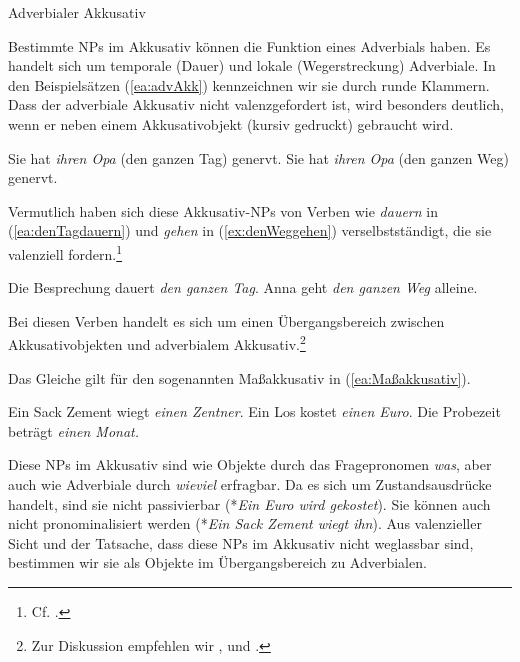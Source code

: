 \newpage
\begin{Exkurs}{Adverbialer Akkusativ}\label{Exkurs:adverbialerAkkusativ}

Bestimmte NPs im Akkusativ können die Funktion eines Adverbials haben. Es handelt sich um temporale (Dauer) und lokale (Wegerstreckung) Adverbiale. In den Beispielsätzen (\ref{ea:advAkk}) kennzeichnen wir sie durch runde Klammern. Dass der adverbiale Akkusativ nicht valenzgefordert ist, wird besonders deutlich, wenn er neben einem Akkusativobjekt (kursiv gedruckt) gebraucht wird. 

\ea \label{ea:advAkk}
\ea \label{ea:tempAkk} Sie hat \textit{ihren Opa} (den ganzen Tag) genervt.
\ex \label{ex:lokAkk} Sie hat \textit{ihren Opa} (den ganzen Weg) genervt.
\z
\z 

Vermutlich haben sich diese Akkusativ-NPs von Verben wie \textit{dauern} in (\ref{ea:denTagdauern}) und \textit{gehen} in (\ref{ex:denWeggehen}) verselbstständigt, die sie valenziell fordern.\footnote{Cf. \citet[350]{Rostila2007}.} 

\ea \label{ea:AkkobjwirdadvAkk}
\ea \label{ea:denTagdauern} Die Besprechung dauert \textit{den ganzen Tag}. 
\ex \label{ex:denWeggehen} Anna geht \textit{den ganzen Weg} alleine.
\z 
\z 

Bei diesen Verben handelt es sich um einen Übergangsbereich zwischen Akkusativobjekten und adverbialem Akkusativ.\footnote{Zur Diskussion empfehlen wir \citet[58--61]{Bausewein1990}, \citet[31--33]{Duerscheid1999} und \citet[147--149]{Welke2019}.} 

Das Gleiche gilt für den sogenannten Maßakkusativ in (\ref{ea:Maßakkusativ}).

\ea \label{ea:Maßakkusativ}
\ea \label{ea:wiegen} Ein Sack Zement wiegt \textit{einen Zentner}.
\ex \label{ex:kosten} Ein Los kostet \textit{einen Euro}.
\ex \label{ex:betragen} Die Probezeit beträgt \textit{einen Monat.}
\z 
\z 

Diese NPs im Akkusativ sind wie Objekte durch das Fragepronomen \textit{was}, aber auch wie Adverbiale durch \textit{wieviel} erfragbar. Da es sich um Zustandsausdrücke handelt, sind sie nicht passivierbar (*\textit{Ein Euro wird gekostet}). Sie können auch nicht pronominalisiert werden (*\textit{Ein Sack Zement wiegt ihn}). Aus valenzieller Sicht und der Tatsache, dass diese NPs im Akkusativ nicht weglassbar sind, bestimmen wir sie als Objekte im Übergangsbereich zu Adverbialen. 

\end{Exkurs}


